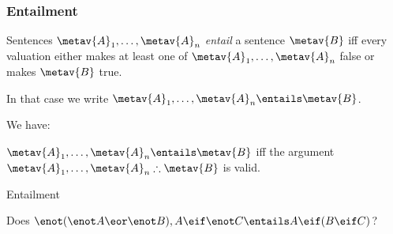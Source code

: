 \begin{frame}
\frametitle{Entailment}

\begin{definition}
Sentences $\metav{A}_1, \dots, \metav{A}_n$ \emph{entail} a sentence
$\metav{B}$ iff every valuation either makes at least one of
$\metav{A}_1, \dots, \metav{A}_n$ false or makes $\metav{B}$ true.

In that case we write $\metav{A}_1, \dots, \metav{A}_n \entails \metav{B}$.
\end{definition}

We have:
\begin{center}
$\metav{A}_1, \dots, \metav{A}_n \entails \metav{B}$ iff the argument
$\metav{A}_1, \dots, \metav{A}_n \therefore \metav{B}$ is valid.
\end{center}
\end{frame}

\begin{frame}{Entailment}

Does $\enot(\enot A \eor \enot B), A \eif \enot C \entails A \eif (B \eif C)$?

\end{frame}

